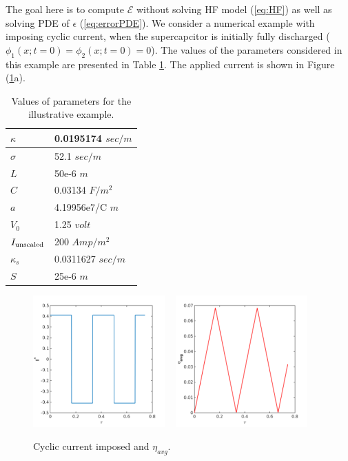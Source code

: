 \documentclass[]{article}
\begin{document}
The goal here is to compute $\mathcal{E}$ without solving HF model (\ref{eq:HF}) as well as solving PDE of $\epsilon$ (\ref{eq:errorPDE}). We consider a numerical example with imposing cyclic current, when the supercapcitor is initially fully discharged ($\phi_1(x;t=0) = \phi_2(x;t=0)=0$).
%
The values of the parameters considered in this example are presented in Table \ref{table:example}. The applied current is shown in Figure (\ref{fig:I_cycl}a). 
%
%
\begin{table}[h]
\centering
\caption{Values of parameters for the illustrative example.}
\label{table:example}
\begin{tabular}{|l|l|}
\hline
$\kappa$ & 0.0195174 $sec/m$\\ \hline
$\sigma$ & 52.1  $sec/m$\\ \hline
$L$         & 50e-6  $m$\\ \hline
$C$         & 0.03134  $ F/m^2$\\ \hline
$a$         & 4.19956e7/C   $m$\\ \hline
$V_0$      & 1.25   $volt$\\ \hline
$I_{\rm unscaled}$ & 200  $Amp/m^2$\\ \hline
$\kappa_s$ & 0.0311627 $sec/m$\\ \hline
$S$         & 25e-6  $m$\\ \hline
\end{tabular}
\end{table}

\vspace{-0.2in}
\begin{figure}[h]
    \centering
    \includegraphics[trim = 0in 0in 0in 0in, clip, width=0.45\textwidth]{figures/cyclic_new/I_t.png}
    ~
    \includegraphics[trim = 0in 0in 0in 0in, clip, width=0.45\textwidth]{figures/cyclic_new/etaavg_t.png} 
\vspace{-0.2in}         
    \caption{Cyclic current imposed and $\eta_{avg}$.}
    \label{fig:I_cycl}    
\end{figure}
\end{document}
